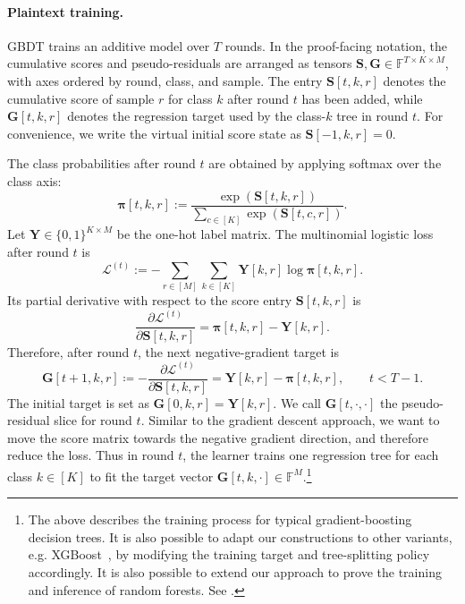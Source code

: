 \paragraph{Plaintext training.}
GBDT trains an additive model over $T$ rounds. In the proof-facing notation,
the cumulative scores and pseudo-residuals are arranged as tensors
$\mathbf{S},\mathbf{G}\in\mathbb{F}^{T\times K\times M}$, with axes ordered by
round, class, and sample. The entry $\mathbf{S}[t,k,r]$ denotes the cumulative
score of sample $r$ for class $k$ after round $t$ has been added, while
$\mathbf{G}[t,k,r]$ denotes the regression target used by the class-$k$ tree in
round $t$. For convenience, we write the virtual initial score state as
$\mathbf{S}[-1,k,r]=0$.

The class probabilities after round $t$ are obtained by applying softmax over
the class axis:
\begin{equation}
\boldsymbol{\pi}[t,k,r]
:=
\frac{\exp(\mathbf{S}[t,k,r])}
{\sum_{c\in[K]} \exp(\mathbf{S}[t,c,r])}.
\end{equation}
Let $\mathbf{Y}\in\{0,1\}^{K\times M}$ be the one-hot label matrix. The
multinomial logistic loss after round $t$ is
\begin{equation}
\mathcal{L}^{(t)}
:=
-\sum_{r\in[M]}\sum_{k\in[K]}
\mathbf{Y}[k,r]\log \boldsymbol{\pi}[t,k,r].
\end{equation}
Its partial derivative with respect to the score entry
$\mathbf{S}[t,k,r]$ is
\begin{equation}
\frac{\partial \mathcal{L}^{(t)}}{\partial \mathbf{S}[t,k,r]}
=
\boldsymbol{\pi}[t,k,r]-\mathbf{Y}[k,r].
\end{equation}
Therefore, after round $t$, the next negative-gradient target is
\begin{equation}\label{eq:plain-pseudoresidual}
\mathbf{G}[t+1,k,r]
\coloneqq
-\frac{\partial \mathcal{L}^{(t)}}{\partial \mathbf{S}[t,k,r]}
=
\mathbf{Y}[k,r]-\boldsymbol{\pi}[t,k,r],
\qquad t<T-1.
\end{equation}
The initial target is set as $\mathbf{G}[0,k,r]=\mathbf{Y}[k,r]$. We call
$\mathbf{G}[t,\cdot,\cdot]$ the pseudo-residual slice for round $t$. Similar to the gradient descent
approach, we want to move the score matrix towards the negative gradient direction, and therefore reduce the loss.
Thus in round $t$, the
learner trains one regression tree for each class $k\in[K]$ to fit the target
vector $\mathbf{G}[t,k,\cdot]\in\mathbb{F}^{M}$.\footnote{The above describes the training process for typical gradient-boosting decision trees. 
It is also possible to adapt our constructions to other variants,
e.g. XGBoost~\cite{xgboost16},
by modifying the training target and tree-splitting policy accordingly.
It is also possible to extend our approach to prove
the training and inference of random forests.
See .}

